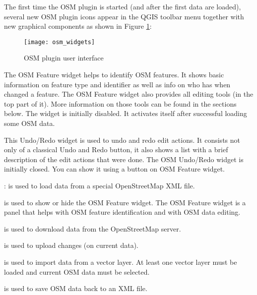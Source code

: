 The first time the OSM plugin is started (and after the first data are
loaded), several new OSM plugin icons appear in the QGIS toolbar menu
together with new graphical components as shown in Figure
\ref{fig:osmwidget}:

\begin{figure}[ht]
   \centering
   \texttt{[image: osm\_widgets]}
   \caption{OSM plugin user interface \nixcaption}\label{fig:osmwidget}
\end{figure}


The OSM Feature widget helps to identify OSM features. It
shows basic information on feature type and identifier as well as info on
who has when changed a feature. The OSM Feature widget also provides all
editing tools (in the top part of it). More information on those tools can be
found in the sections below. The widget is initially disabled. It
activates itself after successful loading some OSM data.


This Undo/Redo widget is used to undo and redo edit actions. It consists
not only of a classical Undo and Redo button, it also shows a list with a
brief description of the edit actions that were done. The OSM Undo/Redo
widget is initially closed. You can show it using a button on OSM Feature
widget.


\begin{description}
\item {}: is used to load data from a
special OpenStreetMap XML file.
\item {} is
used to show or hide the OSM Feature widget. The OSM Feature widget is a
panel that helps with OSM feature identification and with OSM data editing.
\item {} is used to download data
from the OpenStreetMap server.
\item {} is used to upload changes
(on current data).
\item {} is used to import
data from a vector layer. At least one vector layer must be loaded and
current OSM data must be selected.
\item {} is used to save OSM data
back to an XML file.
\end{description}


